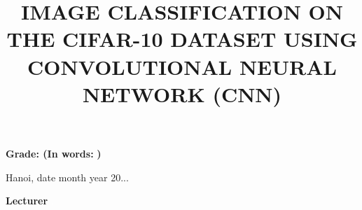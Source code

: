 \documentclass[12pt, a4paper, openany]{report}
\begin{document}
 \dotfill \vspace{0.25cm} \par
 \dotfill \vspace{0.25cm} \par
 \dotfill \vspace{0.25cm} \par
 \dotfill \vspace{0.25cm} \par
 \dotfill \vspace{0.25cm} \par
 \dotfill \vspace{0.25cm} \par
 \dotfill \vspace{0.25cm} \par
 \dotfill \vspace{0.25cm} \par
 \dotfill \vspace{0.25cm} \par
 \dotfill \vspace{0.25cm} \par
 \dotfill
 \vspace{1.0cm}

 {\textbf{\large{Grade: }}} \hspace{1.0cm}\textbf{(In words:} \hspace{2.5cm}\textbf{)} %
 \vspace{1.5cm}

 \begin{flushright}
    Hanoi, date \hspace{0.75cm} month \hspace{0.75cm} year 20...\hspace{0.75cm} %
    
    {\textbf{\large{Lecturer }}} \hspace{2cm} \textcolor{white}{.} %
 \end{flushright}
 \clearpage
 \restoregeometry

 \tableofcontents
 \cleardoublepage
 \listoffigures
 \cleardoublepage

 \title{\bfseries IMAGE CLASSIFICATION ON THE CIFAR-10 DATASET USING CONVOLUTIONAL NEURAL NETWORK (CNN)} %
 \author{}
 \date{}
 \maketitle
\end{document}
